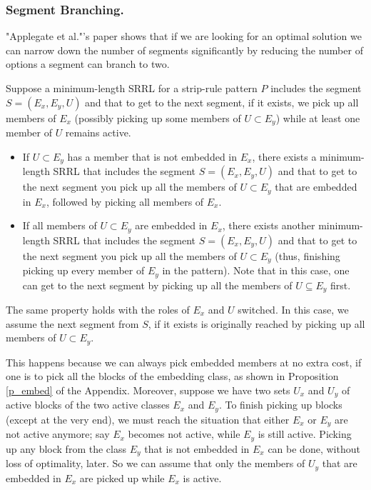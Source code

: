 \subsubsection{Segment Branching.}

"Applegate et al."'s paper \cite{ACJKLW07}
shows that if we are looking for an optimal solution we can narrow down the number of segments significantly by reducing the number of options a segment can branch to two.

Suppose a minimum-length SRRL for a strip-rule pattern $P$ includes the segment $S = (E_{x}, E_{y}, U)$ and that to get to the next segment, if it exists, we pick up all members of $E_{x}$
(possibly picking up some members of $U \subset E_{y}$)
while at least one member of $U$ remains active.

\begin{itemize}

\item If $U \subset E_{y}$ has a member that is not embedded in $E_{x}$,
 there exists a minimum-length SRRL that includes the segment
$S = (E_{x}, E_{y}, U)$ and that to get to the next segment you pick up
 all the members of $U \subset E_{y}$ that are embedded in $E_{x}$,
 followed by picking all members of $E_{x}$.

\item If all members of $U \subset E_{y}$ are embedded in $E_{x}$,
 there exists another minimum-length SRRL that includes the segment
$S = (E_{x}, E_{y}, U)$ and that to get to the next segment you
 pick up all the members of $U \subset E_{y}$
(thus, finishing picking up every member of $E_{y}$ in the pattern).
Note that in this case, one can get to the next segment by picking up all
the members of $U \subseteq E_y$ first.

\end{itemize}

The same property holds with the roles of $E_{x}$ and $U$ switched. In this case, we assume the next segment from $S$, if it exists is originally reached by picking up all members of $U \subset E_{y}$.

This happens because we can always pick embedded members at no extra cost,
if one is to pick all the blocks of the embedding class, as shown in
Proposition \ref{p_embed} of the Appendix.
Moreover, suppose we have two sets $U_x$ and $U_y$
of active blocks of the two active classes $E_x$ and $E_y$.
To finish picking up blocks (except at the very end), we must
reach the situation that either $E_x$ or $E_y$ are not active anymore;
say $E_x$ becomes not active, while $E_y$ is still active.
Picking up any block from the class $E_y$ that is not embedded in $E_x$
can be done, without loss of optimality, later.
So we can assume that
 only the members of $U_y$ that are embedded in $E_x$ are picked up
while $E_x$ is active.

